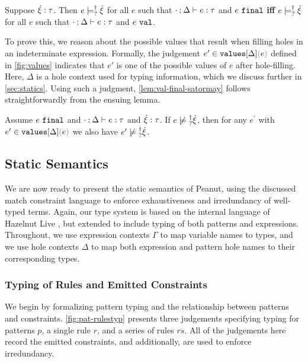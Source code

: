 \begin{lemma}
	\label{lem:val-final-satormay}
	Suppose $\dot{\xi} : \tau$. Then $e \models_{?}^{\dag} \dot{\xi}$ for all $e$ such that $\cdot \mathbin{;} \Delta \vdash e : \tau$ and $e ~\mathtt{final}$ \textbf{iff} $e \models_{?}^{\dag} \dot{\xi}$ for all $e$ such that $\cdot \mathbin{;} \Delta \vdash e : \tau$ and $e ~\mathtt{val}$.
\end{lemma}

To prove this, we reason about the possible values that result when filling holes in an indeterminate expression. Formally, the judgement $\inValues{e'}{\Delta}{e}$ defined in \autoref{fig:values} indicates that $e'$ is one of the possible values of $e$ after hole-filling. Here, $\Delta$ is a hole context used for typing information, which we discuss further in \autoref{sec:statics}. Using such a judgment, \autoref{lem:val-final-satormay} follows straightforwardly from the ensuing lemma.

\begin{lemma}
	\label{lem:complete-not-satormay}
	Assume $e ~\mathtt{final}$ and $\cdot \mathbin{;} \Delta \vdash e : \tau$ and
	$\dot{\xi} : \tau$. If $\cnotsatisfyormay{e}{\hxi}$, then for any $e^\prime$ with
	$\inValues{e'}{\Delta}{e}$ we also have $\cnotsatisfyormay{e'}{\hxi}$.
\end{lemma}



\subsection{Static Semantics}\label{sec:statics}
 We are now ready to present the static semantics of Peanut, using the discussed match constraint language to enforce exhaustiveness and irredundancy of well-typed terms. Again, our type system is based on the internal language of Hazelnut Live \cite{DBLP:journals/pacmpl/OmarVCH19}, but extended to include typing of both patterns and expressions. Throughout, we use expression contexts $\Gamma$ to map variable names to types, and we use hole contexts $\Delta$ to map both expression and pattern hole names to their corresponding types.
 
 
  
 \subsubsection{Typing of Rules and Emitted Constraints}
 We begin by formalizing pattern typing and the relationship between patterns and constraints. \autoref{fig:pat-rulestyp} presents three judgements specifying typing for patterns $p$, a single rule $r$, and a series of rules $rs$. All of the judgements here record the emitted constraints, and additionally, are used to enforce irredundancy.
 
